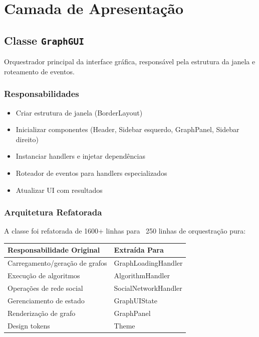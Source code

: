 \documentclass[12pt,a4paper]{article}
\begin{document}
    \newpage

    \section{Camada de Apresentação}

    \subsection{Classe \texttt{GraphGUI}}

    Orquestrador principal da interface gráfica, responsável pela estrutura da janela e roteamento de eventos.

    \subsubsection{Responsabilidades}

    \begin{itemize}
        \item Criar estrutura de janela (BorderLayout)
        \item Inicializar componentes (Header, Sidebar esquerdo, GraphPanel, Sidebar direito)
        \item Instanciar handlers e injetar dependências
        \item Roteador de eventos para handlers especializados
        \item Atualizar UI com resultados
    \end{itemize}

    \subsubsection{Arquitetura Refatorada}

    A classe foi refatorada de 1600+ linhas para ~250 linhas de orquestração pura:

    \begin{table}[h]
        \centering
        \begin{tabular}{|l|l|}
            \hline
            \textbf{Responsabilidade Original} & \textbf{Extraída Para} \\
            \hline
            Carregamento/geração de grafos & GraphLoadingHandler \\
            \hline
            Execução de algoritmos & AlgorithmHandler \\
            \hline
            Operações de rede social & SocialNetworkHandler \\
            \hline
            Gerenciamento de estado & GraphUIState \\
            \hline
            Renderização de grafo & GraphPanel \\
            \hline
            Design tokens & Theme \\
            \hline
        \end{tabular}
    \end{table}
\end{document}

